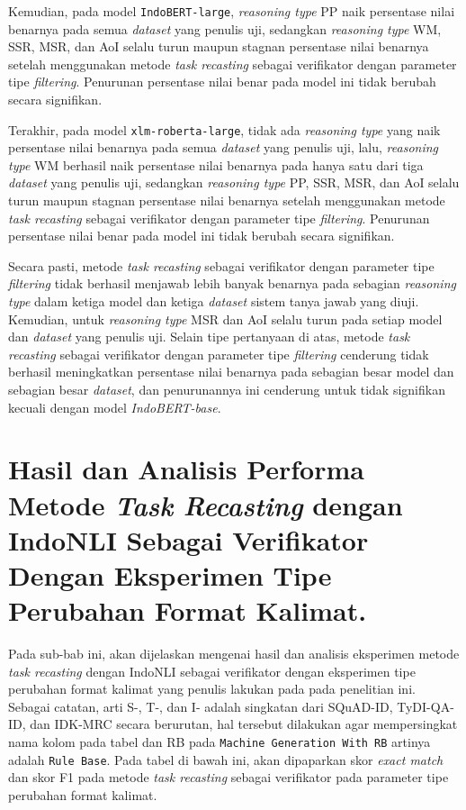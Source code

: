 Kemudian, pada model \texttt{IndoBERT-large}, \emph{reasoning type} PP naik persentase nilai benarnya pada semua \emph{dataset} yang penulis uji, sedangkan \emph{reasoning type} WM, SSR, MSR, dan AoI selalu turun maupun stagnan persentase nilai benarnya setelah menggunakan metode \emph{task recasting} sebagai verifikator dengan parameter tipe \emph{filtering}. Penurunan persentase nilai benar pada model ini tidak berubah secara signifikan.

Terakhir, pada model \texttt{xlm-roberta-large}, tidak ada \emph{reasoning type} yang naik persentase nilai benarnya pada semua \emph{dataset} yang penulis uji, lalu, \emph{reasoning type} WM berhasil naik persentase nilai benarnya pada hanya satu dari tiga \emph{dataset} yang penulis uji, sedangkan \emph{reasoning type} PP, SSR, MSR, dan AoI selalu turun maupun stagnan persentase nilai benarnya setelah menggunakan metode \emph{task recasting} sebagai verifikator dengan parameter tipe \emph{filtering}. Penurunan persentase nilai benar pada model ini tidak berubah secara signifikan.

Secara pasti, metode \emph{task recasting} sebagai verifikator dengan parameter tipe \emph{filtering} tidak berhasil menjawab lebih banyak benarnya pada sebagian \emph{reasoning type} dalam ketiga model dan ketiga \emph{dataset} sistem tanya jawab yang diuji. Kemudian, untuk \emph{reasoning type} MSR dan AoI selalu turun pada setiap model dan \emph{dataset} yang penulis uji. Selain tipe pertanyaan di atas, metode \emph{task recasting} sebagai verifikator dengan parameter tipe \emph{filtering} cenderung tidak berhasil meningkatkan persentase nilai benarnya pada sebagian besar model dan sebagian besar \emph{dataset}, dan penurunannya ini cenderung untuk tidak signifikan kecuali dengan model \emph{IndoBERT-base}.

\section{Hasil dan Analisis Performa Metode \emph{Task Recasting} dengan IndoNLI Sebagai Verifikator Dengan Eksperimen Tipe Perubahan Format Kalimat.}
\label{5.5}
Pada sub-bab ini, akan dijelaskan mengenai hasil dan analisis eksperimen metode \emph{task recasting} dengan IndoNLI sebagai verifikator dengan eksperimen tipe perubahan format kalimat yang penulis lakukan pada pada penelitian ini. Sebagai catatan, arti S-, T-, dan I- adalah singkatan dari SQuAD-ID, TyDI-QA-ID, dan IDK-MRC secara berurutan, hal tersebut dilakukan agar mempersingkat nama kolom pada tabel dan RB pada \texttt{Machine Generation With RB} artinya adalah \texttt{Rule Base}. Pada tabel di bawah ini, akan dipaparkan skor \emph{exact match} dan skor F1 pada metode \emph{task recasting} sebagai verifikator pada parameter tipe perubahan format kalimat.

